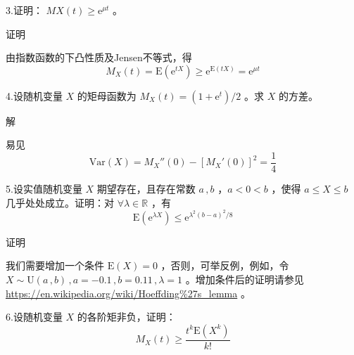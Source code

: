 \documentclass[12pt,hyperref,]{ctexart}
\begin{document}
\kaishu

3.证明： \(MX(t)\ge \mathrm{e}^{\mu t}\) 。

\vspace{1em}

\heiti

证明

\songti

由指数函数的下凸性质及Jensen不等式，得 \begin{equation*}
M_X(t)=\mathrm{E}\left(\mathrm{e}^{tX}\right)\ge\mathrm{e}^{\mathrm{E}(tX)}=\mathrm{e}^{\mu t}
\end{equation*}

\vspace{3em}

\kaishu

4.设随机变量 \(X\) 的矩母函数为 \(M_X(t)=(1+\mathrm{e}^t)/2\) 。求 \(X\)
的方差。

\vspace{1em}

\heiti

解

\songti

易见 \begin{equation*}
\mathrm{Var}(X)=M_X''(0)-[M_X'(0)]^2=\frac 14
\end{equation*}

\vspace{3em}

\kaishu

5.设实值随机变量 \(X\) 期望存在，且存在常数 \(a\, ,b\) ，\(a<0<b\)
，使得 \(a\le X\le b\) 几乎处处成立。证明：对
\(\forall\lambda \in \mathbb{R}\) ，有 \begin{equation*}
\mathrm{E}(\mathrm{e}^{\lambda X})\le \mathrm{e}^{\lambda^2(b-a)^2/8}
\end{equation*}

\vspace{1em}

\heiti

证明

\songti

我们需要增加一个条件 \(\mathrm{E}(X)=0\) ，否则，可举反例，例如，令
\(X\sim\mathrm{U}(a\, ,b)\, ,a=-0.1\, , b=0.11\, ,\lambda=1\)
。增加条件后的证明请参见
\url{https://en.wikipedia.org/wiki/Hoeffding\%27s_lemma} 。

\vspace{3em}

\kaishu

6.设随机变量 \(X\) 的各阶矩非负，证明： \begin{equation*}
M_X(t)\ge \frac{t^k\mathrm{E}(X^k)}{k!}
\end{equation*}
\end{document}
